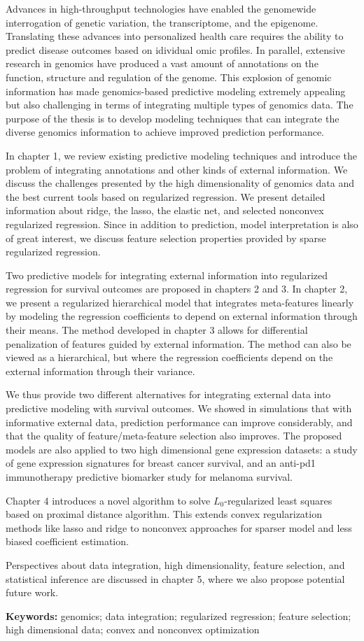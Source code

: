  Advances in high-throughput technologies have enabled the genomewide interrogation of genetic variation, the transcriptome, and the epigenome. Translating these advances into personalized health care requires the ability to predict disease outcomes based on idividual omic profiles. In parallel, extensive research in genomics have produced a vast amount of annotations on the function, structure and regulation of the genome. This explosion of genomic information has made genomics-based predictive modeling extremely appealing but also challenging in terms of integrating multiple types of genomics data.  The purpose of the thesis is to develop modeling techniques that can integrate the diverse genomics information to achieve improved prediction performance. 

In chapter 1, we review existing predictive modeling techniques and introduce the problem of integrating annotations and other kinds of external information. We discuss the challenges presented by the high dimensionality of genomics data and the best current tools based on regularized regression. We present detailed information about ridge,  the lasso, the elastic net, and selected nonconvex regularized regression. Since in addition to  prediction, model interpretation is also of great interest, we discuss feature selection properties provided by sparse regularized regression.

Two predictive models for integrating external information into regularized regression for survival outcomes are proposed in chapters 2 and 3. In chapter 2, we present a regularized hierarchical model that integrates meta-features linearly by modeling the regression coefficients to depend on external information through their means. The method developed in chapter 3 allows for differential penalization of features guided by external information. The method can also be viewed as a hierarchical, but  where the regression coefficients depend on the external information through their variance. 

We thus provide two different alternatives for integrating external data into predictive modeling with survival outcomes. We showed in simulations that with informative external data, prediction performance can improve considerably, and that the quality of feature/meta-feature selection also improves. The proposed models are also applied to two high dimensional gene expression datasets: a study of gene expression signatures for breast cancer survival, and an anti-pd1 immunotherapy predictive biomarker study for melanoma survival. 

Chapter 4 introduces a novel algorithm to solve $L_0$-regularized least squares based on proximal distance algorithm. This extends convex regularization methods like lasso and ridge to nonconvex approaches for sparser model and less biased coefficient estimation. 

Perspectives about data integration, high dimensionality, feature selection, and statistical inference are discussed in chapter 5, where we also propose potential future work.

\bigskip
\textbf{Keywords:} genomics; data integration; regularized regression; feature selection; high dimensional data; convex and nonconvex optimization 